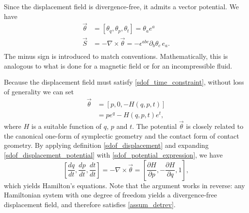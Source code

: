 \documentclass[fleqn,10pt]{wlscirep}
\begin{document}
 Since the displacement field is divergence-free, it admits a vector potential. We have
\begin{equation}\label{sdof_displacement_potential}
\begin{aligned}
	\vec{\theta} &= [\theta_q, \theta_p, \theta_t] = \theta_a e^a \\
	\vec{S} &= - \nabla \times \vec{\theta} = - \epsilon^{abc} \partial_b \theta_c \, e_a. \\
\end{aligned}
\end{equation}
The minus sign is introduced to match conventions. Mathematically, this is analogous to what is done for a magnetic field or for an incompressible fluid.

Because the displacement field must satisfy \ref{sdof_time_constraint}, without loss of generality we can set
\begin{equation}\label{sdof_potential_expression}
\begin{aligned}
	\vec{\theta} &= [p, 0, -H(q,p,t)] \\
	&= p e^q - H(q,p,t) e^t,
\end{aligned}
\end{equation}
where $H$ is a suitable function of $q$, $p$ and $t$. The potential $\vec{\theta}$ is closely related to the canonical one-form of symplectic geometry and the contact form of contact geometry. By applying definition \ref{sdof_displacement} and expanding \ref{sdof_displacement_potential} with \ref{sdof_potential_expression}, we have
\begin{equation}\label{sdof_Ham_eq}
	\left[ \frac{dq}{dt},\frac{dp}{dt},\frac{dt}{dt} \right] = - \nabla \times \vec{\theta} = \left[ \frac{\partial H}{\partial p},-\frac{\partial H}{\partial q}, 1 \right],
\end{equation}
which yields Hamilton's equations. Note that the argument works in reverse: any Hamiltonian system with one degree of freedom yields a divergence-free displacement field, and therefore satisfies \ref{assum_detrev}.
\end{document}
